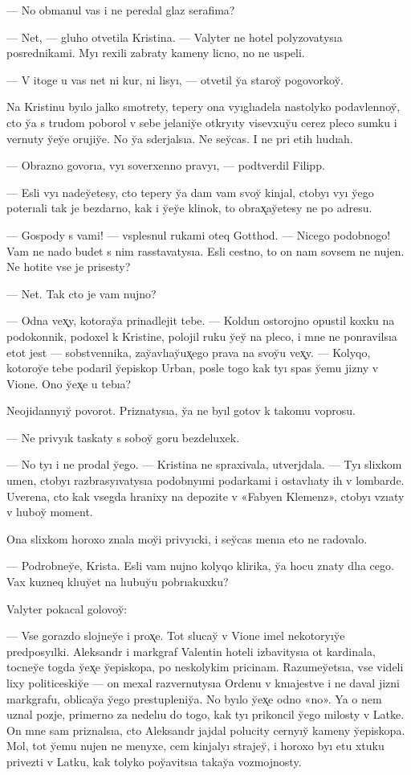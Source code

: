 \documentclass[10pt]{book}
\begin{document}
— No obmanul vas i ne peredal glaz serafima?

— Net, — gluho otvetila Kristina. — Valyter ne hotel polyzovatysıa posrednikami. Myı rexili zabraty kameny licno, no ne uspeli.

— V itoge u vas net ni kur, ni lisyı, — otvetil y̆a staroy̆ pogovorkoy̆.

Na Kristinu byılo jalko smotrety, tepery ona vyıglıadela nastolyko podavlennoy̆, cto y̆a s trudom poborol v sebe jelaniy̆e otkryıty visevxuy̆u cerez pleco sumku i vernuty y̆ey̆e orujiy̆e. No y̆a sderjalsıa. Ne sey̆cas. I ne pri etih lıudıah.

— Obrazno govorıa, vyı soverxenno pravyı, — podtverdil Filipp.

— Esli vyı nadey̆etesy, cto tepery y̆a dam vam svoy̆ kinjal, ctobyı vyı y̆ego poterıali tak je bezdarno, kak i y̆ey̆e klinok, to obrax̨ay̆etesy ne po adresu.

— Gospody s vami! — vsplesnul rukami oteq Gotthod. — Nicego podobnogo! Vam ne nado budet s nim rasstavatysıa. Esli cestno, to on nam sovsem ne nujen. Ne hotite vse je prisesty?

— Net. Tak cto je vam nujno?

— Odna vex̨y, kotoray̆a prinadlejit tebe. — Koldun ostorojno opustil koxku na podokonnik, podoxel k Kristine, polojil ruku y̆ey̆ na pleco, i mne ne ponravilsıa etot jest — sobstvennika, zay̆avlıay̆ux̨ego prava na svoy̆u vex̨y. — Kolyqo, kotoroy̆e tebe podaril y̆episkop Urban, posle togo kak tyı spas y̆emu jizny v Vione. Ono y̆ex̨e u tebıa?

Neojidannyıy̆ povorot. Priznatysıa, y̆a ne byıl gotov k takomu voprosu.

— Ne privyık taskaty s soboy̆ goru bezdeluxek.

— No tyı i ne prodal y̆ego. — Kristina ne spraxivala, utverjdala. — Tyı slixkom umen, ctobyı razbrasyıvatysıa podobnyımi podarkami i ostavlıaty ih v lombarde. Uverena, cto kak vsegda hranixy na depozite v «Fabyen Klemenz», ctobyı vzıaty v lıuboy̆ moment.

Ona slixkom horoxo znala moy̆i privyıcki, i sey̆cas menıa eto ne radovalo.

— Podrobney̆e, Krista. Esli vam nujno kolyqo klirika, y̆a hocu znaty dlıa cego. Vax kuzneq klıuy̆et na lıubuy̆u pobrıakuxku?

Valyter pokacal golovoy̆:

— Vse gorazdo slojney̆e i prox̨e. Tot slucay̆ v Vione imel nekotoryıy̆e predposyılki. Aleksandr i markgraf Valentin hoteli izbavitysıa ot kardinala, tocney̆e togda y̆ex̨e y̆episkopa, po neskolykim pricinam. Razumey̆etsıa, vse videli lixy politiceskiy̆e — on mexal razvernutysıa Ordenu v knıajestve i ne daval jizni markgrafu, oblicay̆a y̆ego prestupleniy̆a. No byılo y̆ex̨e odno «no». Ya o nem uznal pozje, primerno za nedelıu do togo, kak tyı prikoncil y̆ego milosty v Latke. On mne sam priznalsıa, cto Aleksandr jajdal polucity cernyıy̆ kameny y̆episkopa. Mol, tot y̆emu nujen ne menyxe, cem kinjalyı strajey̆, i horoxo byı etu xtuku privezti v Latku, kak tolyko poy̆avitsıa takay̆a vozmojnosty.
\end{document}
